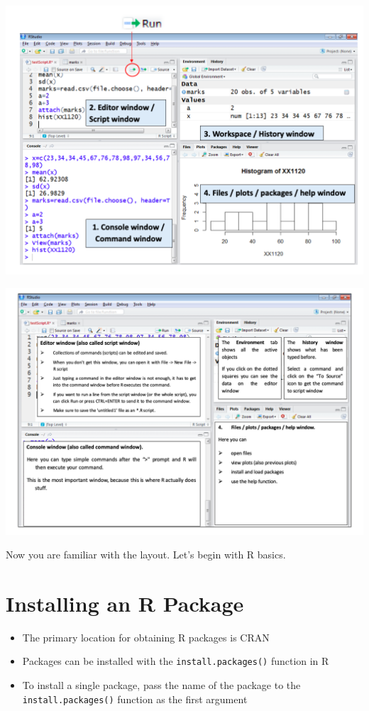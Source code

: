 \documentclass[]{book}
\begin{document}
\begin{center}\includegraphics[width=0.9\linewidth]{figure/Rstudio1} \end{center}

\begin{center}\includegraphics[width=0.9\linewidth]{figure/Rstudio2} \end{center}

Now you are familiar with the layout. Let's begin with R basics.

\hypertarget{installing-an-r-package}{%
\section{Installing an R Package}\label{installing-an-r-package}}

\begin{itemize}
\item
  The primary location for obtaining R packages is CRAN
\item
  Packages can be installed with the \texttt{install.packages()} function in R
\item
  To install a single package, pass the name of the package to the \texttt{install.packages()} function as the first argument
\end{itemize}
\end{document}
